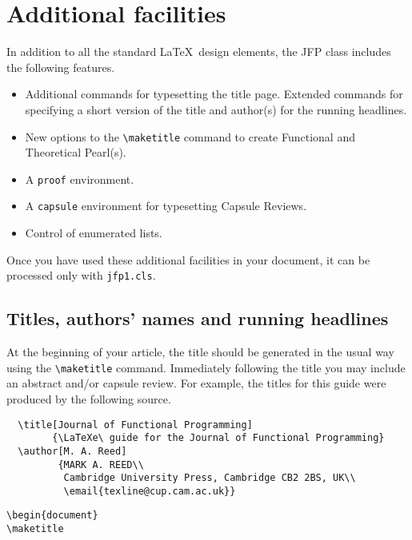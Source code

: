 \documentclass{jfp1}
\begin{document}
\section{Additional facilities}

In addition to all the standard \LaTeX\ design elements, the JFP class
includes the following features.
%
\begin{itemize}
  \item Additional commands for typesetting the title page. Extended
        commands for specifying a short version of the title and author(s)
        for the running headlines.
  \item New options to the \verb"\maketitle" command to create Functional and
        Theoretical Pearl(s).
  \item A \verb"proof" environment.
  \item A \verb"capsule" environment for typesetting Capsule Reviews.
  \item Control of enumerated lists.
\end{itemize}
%
Once you have used these additional facilities in your document,
it can be processed only with \verb"jfp1.cls".

\subsection{Titles, authors' names and running headlines}

At the beginning of your article, the title should be generated in the
usual way using the \verb"\maketitle" command. Immediately following the
title you may include an abstract and/or capsule review. For example, the titles
for this guide were produced by the following source.
%
\begin{verbatim}
  \title[Journal of Functional Programming]
        {\LaTeXe\ guide for the Journal of Functional Programming}
  \author[M. A. Reed]
         {MARK A. REED\\
          Cambridge University Press, Cambridge CB2 2BS, UK\\
          \email{texline@cup.cam.ac.uk}}
\end{verbatim}

\verb"\begin{document}"\\
\indent\verb"\maketitle"
\end{document}
